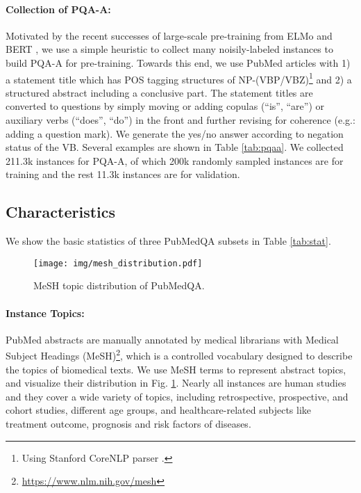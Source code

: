 \documentclass[11pt,a4paper]{article}
\begin{document}
\paragraph{Collection of PQA-A:} Motivated by the recent successes of large-scale pre-training from ELMo \cite{peters2018deep} and BERT \cite{devlin2018bert}, we use a simple heuristic to collect many noisily-labeled instances to build PQA-A for pre-training. Towards this end, we use PubMed articles with 1) a statement title which has POS tagging structures of NP-(VBP/VBZ)\footnote{Using Stanford CoreNLP parser \cite{manning-EtAl:2014:P14-5}.} and 2) a structured abstract including a conclusive part. The statement titles are converted to questions by simply moving or adding copulas (``is'', ``are'') or auxiliary verbs (``does'', ``do'') in the front and further revising for coherence (e.g.: adding a question mark). We generate the yes/no answer according to negation status of the VB. Several examples are shown in Table \ref{tab:pqaa}. We collected 211.3k instances for PQA-A, of which 200k randomly sampled instances are for training and the rest 11.3k instances are for validation.

\subsection{Characteristics}

We show the basic statistics of three PubMedQA subsets in Table \ref{tab:stat}.

\begin{figure}
    \centering
    \texttt{[image: img/mesh\_distribution.pdf]}
    \vskip -0.15cm
    \caption{MeSH topic distribution of PubMedQA.}
    \label{fig:mesh}
    \vspace{-0.5em}
\end{figure}


\paragraph{Instance Topics:} PubMed abstracts are manually annotated by medical librarians with Medical Subject Headings (MeSH)\footnote{\url{https://www.nlm.nih.gov/mesh}}, which is a controlled vocabulary designed to describe the topics of biomedical texts. We use MeSH terms to represent abstract topics, and visualize their distribution in Fig. \ref{fig:mesh}. Nearly all instances are human studies and they cover a wide variety of topics, including retrospective, prospective, and cohort studies, different age groups, and healthcare-related subjects like treatment outcome, prognosis and risk factors of diseases.
\end{document}
